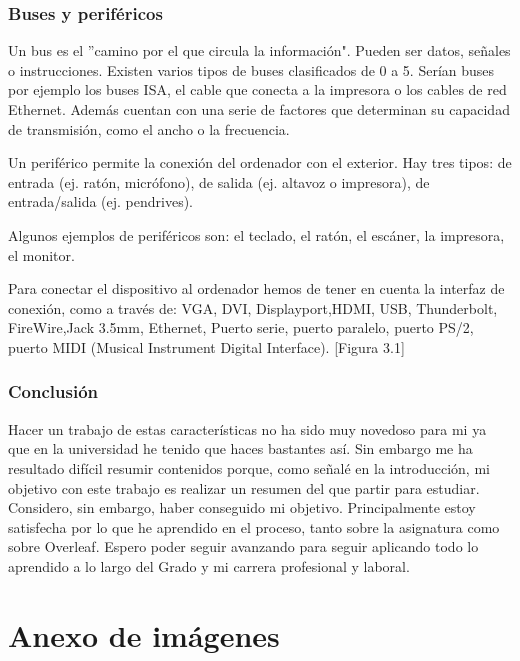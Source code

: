 \documentclass{book}
\begin{document}
\subsection{\textbf{Buses y periféricos}}
\begin{large}
Un bus es el ''camino por el que circula la información". Pueden ser datos, señales o instrucciones. Existen varios tipos de buses clasificados de 0 a 5. Serían buses por ejemplo los buses ISA, el cable que conecta a la impresora o los cables de red Ethernet. Además cuentan con una serie de factores que determinan su capacidad de transmisión, como el ancho o la frecuencia.

Un periférico permite la conexión del ordenador con el exterior. Hay tres tipos: de entrada (ej. ratón, micrófono), de salida (ej. altavoz o impresora), de entrada/salida (ej. pendrives).

Algunos ejemplos de periféricos son: el teclado, el ratón, el escáner, la impresora, el monitor.

Para conectar el dispositivo al ordenador hemos de tener en cuenta la interfaz de conexión, como a través de: VGA, DVI, Displayport,HDMI, USB, Thunderbolt, FireWire,Jack 3.5mm, Ethernet, Puerto serie, puerto paralelo, puerto PS/2, puerto MIDI (Musical Instrument Digital Interface). [Figura 3.1]

\end{large}

\subsection{\textbf{Conclusión}}

\begin{large}

Hacer un trabajo de estas características no ha sido muy novedoso para mi ya que en la universidad he tenido que haces bastantes así. Sin embargo me ha resultado difícil resumir contenidos porque, como señalé en la introducción, mi objetivo con este trabajo es realizar un resumen del que partir para estudiar. Considero, sin embargo, haber conseguido mi objetivo. Principalmente estoy satisfecha por lo que he aprendido en el proceso, tanto sobre la asignatura como sobre Overleaf. Espero poder seguir avanzando para seguir aplicando todo lo aprendido a lo largo del Grado y mi carrera profesional y laboral. 

\end{large}


\chapter{Anexo de imágenes}
\end{document}
